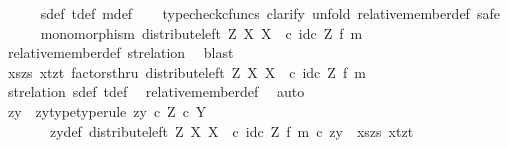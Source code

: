\begin{isabellebody}
\ \ \ \ \isamarkupfalse%
\ s{\isacharunderscore}{\kern0pt}def\ t{\isacharunderscore}{\kern0pt}def\ m{\isacharunderscore}{\kern0pt}def\isanewline
\ \ \isamarkupfalse%
\ {\isacharparenleft}{\kern0pt}typecheck{\isacharunderscore}{\kern0pt}cfuncs{\isacharcomma}{\kern0pt}\ clarify{\isacharcomma}{\kern0pt}\ unfold\ relative{\isacharunderscore}{\kern0pt}member{\isacharunderscore}{\kern0pt}def{}{\isacharcomma}{\kern0pt}\ safe{\isacharparenright}{\kern0pt}\isanewline
\ \ \ \ \isamarkupfalse%
\ {\isachardoublequoteopen}monomorphism\ {\isacharparenleft}{\kern0pt}distribute{\isacharunderscore}{\kern0pt}left\ Z\ X\ X\ \ {\isasymcirc}\isactrlsub c\ {\isacharparenleft}{\kern0pt}id\isactrlsub c\ Z\ {\isasymtimes}\isactrlsub f\ m{\isacharparenright}{\kern0pt}{\isacharparenright}{\kern0pt}{\isachardoublequoteclose}\isanewline
\ \ \ \ \ \ \isamarkupfalse%
\ relative{\isacharunderscore}{\kern0pt}member{\isacharunderscore}{\kern0pt}def{}\ st{\isacharunderscore}{\kern0pt}relation\ \isamarkupfalse%
\ blast\isanewline
\isanewline
\ \ \ \ \isamarkupfalse%
\ {\isachardoublequoteopen}{\isasymlangle}{\isasymlangle}xs{\isacharcomma}{\kern0pt}zs{\isasymrangle}{\isacharcomma}{\kern0pt}\ {\isasymlangle}xt{\isacharcomma}{\kern0pt}zt{\isasymrangle}{\isasymrangle}\ factorsthru\ {\isacharparenleft}{\kern0pt}distribute{\isacharunderscore}{\kern0pt}left\ Z\ X\ X\ \ {\isasymcirc}\isactrlsub c\ {\isacharparenleft}{\kern0pt}id\isactrlsub c\ Z\ {\isasymtimes}\isactrlsub f\ m{\isacharparenright}{\kern0pt}{\isacharparenright}{\kern0pt}{\isachardoublequoteclose}\isanewline
\ \ \ \ \ \ \isamarkupfalse%
\ st{\isacharunderscore}{\kern0pt}relation\ s{\isacharunderscore}{\kern0pt}def\ t{\isacharunderscore}{\kern0pt}def\ \isamarkupfalse%
\ relative{\isacharunderscore}{\kern0pt}member{\isacharunderscore}{\kern0pt}def{}\ \isamarkupfalse%
\ auto\isanewline
\ \ \ \ \isamarkupfalse%
\ \isamarkupfalse%
\ zy\ \ zy{\isacharunderscore}{\kern0pt}type{\isacharbrackleft}{\kern0pt}type{\isacharunderscore}{\kern0pt}rule{\isacharbrackright}{\kern0pt}{\isacharcolon}{\kern0pt}\ {\isachardoublequoteopen}zy\ {\isasymin}\isactrlsub c\ Z\ {\isasymtimes}\isactrlsub c\ Y{\isachardoublequoteclose}\isanewline
\ \ \ \ \ \ \ zy{\isacharunderscore}{\kern0pt}def{\isacharcolon}{\kern0pt}\ {\isachardoublequoteopen}{\isacharparenleft}{\kern0pt}distribute{\isacharunderscore}{\kern0pt}left\ Z\ X\ X\ \ {\isasymcirc}\isactrlsub c\ {\isacharparenleft}{\kern0pt}id\isactrlsub c\ Z\ {\isasymtimes}\isactrlsub f\ m{\isacharparenright}{\kern0pt}{\isacharparenright}{\kern0pt}\ {\isasymcirc}\isactrlsub c\ zy\ {\isacharequal}{\kern0pt}\ {\isasymlangle}{\isasymlangle}xs{\isacharcomma}{\kern0pt}zs{\isasymrangle}{\isacharcomma}{\kern0pt}\ {\isasymlangle}xt{\isacharcomma}{\kern0pt}zt{\isasymrangle}{\isasymrangle}{\isachardoublequoteclose}\isanewline

\end{isabellebody}
